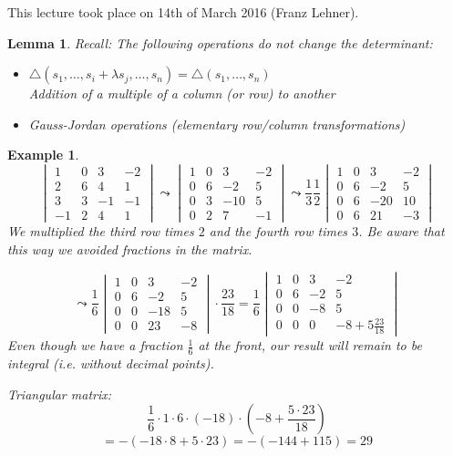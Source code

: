 \documentclass[a4paper,landscape,twocolumn]{article}
\newcommand\meta[3]{This #1 took place on #2 (#3).\par}
\newtheorem{ex}{Example}
\newtheorem{lemma}{Lemma}
\begin{document}
\meta{lecture}{14th of March 2016}{Franz Lehner}

\begin{lemma}
  Recall: The following operations do not change the determinant:
  \begin{itemize}
    \item $\triangle(s_1, \ldots, s_i + \lambda s_j, \ldots, s_n) = \triangle(s_1, \ldots, s_n)$ \\
      Addition of a multiple of a column (or row) to another
    \item Gauss-Jordan operations (elementary row/column transformations)
  \end{itemize}
\end{lemma}

\begin{ex}
  \[
    \begin{vmatrix}
      1 & 0 & 3 & -2 \\
      2 & 6 & 4 & 1 \\
      3 & 3 & -1 & -1 \\
      -1 & 2 & 4 & 1
    \end{vmatrix}
    \leadsto
    \begin{vmatrix}
      1 & 0 & 3 & -2 \\
      0 & 6 & -2 & 5 \\
      0 & 3 & -10 & 5 \\
      0 & 2 & 7 & -1
    \end{vmatrix}
    \leadsto
    \frac13
    \frac12
    \begin{vmatrix}
      1 & 0 & 3 & -2 \\
      0 & 6 & -2 & 5 \\
      0 & 6 & -20 & 10 \\
      0 & 6 & 21 & -3
    \end{vmatrix}
  \]
  We multiplied the third row times $2$ and the fourth row times $3$.
  Be aware that this way we avoided fractions in the matrix.

  \[
    \leadsto
    \frac16
    \begin{vmatrix}
      1 & 0 & 3 & -2 \\
      0 & 6 & -2 & 5 \\
      0 & 0 & -18 & 5 \\
      0 & 0 & 23 & -8
    \end{vmatrix}
    \cdot \frac{23}{18}
    = \frac16
    \begin{vmatrix}
      1 & 0 & 3 & -2 \\
      0 & 6 & -2 & 5 \\
      0 & 0 & -8 & 5 \\
      0 & 0 & 0 & -8+5\frac{23}{18}
    \end{vmatrix}
  \]
  Even though we have a fraction $\frac16$ at the front, our result will
  remain to be integral (i.e. without decimal points).

  Triangular matrix:
  \[ \frac16 \cdot 1 \cdot 6 \cdot (-18) \cdot \left(-8 + \frac{5 \cdot 23}{18}\right) \]
  \[ = -(-18\cdot 8 + 5\cdot 23) = -(-144 + 115) = 29 \]
\end{ex}
\end{document}
